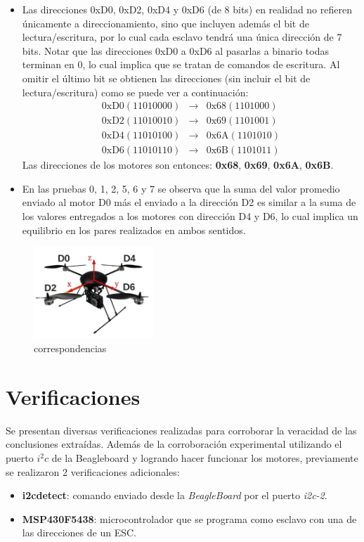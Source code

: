 \documentclass[main]{subfiles}
\begin{document}
\begin{itemize}
\item Las direcciones 0xD0, 0xD2, 0xD4 y 0xD6 (de 8 bits) en realidad no refieren \'unicamente a direccionamiento, sino que incluyen adem\'as el bit de lectura/escritura, por lo cual cada esclavo tendr\'a una \'unica direcci\'on de 7 bits. Notar que las direcciones 0xD0 a 0xD6 al pasarlas a binario todas terminan en 0, lo cual implica que se tratan de comandos de escritura. Al omitir el \'ultimo bit se obtienen las direcciones (sin incluir el bit de lectura/escritura) como se puede ver a continuaci\'on:
\begin{eqnarray}
\mathrm{0xD0} (11010000) &\longrightarrow &\mathrm{0x68} (1101000) \\
\mathrm{0xD2} (11010010) &\longrightarrow &\mathrm{0x69} (1101001) \\
\mathrm{0xD4} (11010100) &\longrightarrow &\mathrm{0x6A} (1101010) \\
\mathrm{0xD6} (11010110) &\longrightarrow &\mathrm{0x6B} (1101011) 
\end{eqnarray}
Las direcciones de los motores son entonces: \textbf{0x68}, \textbf{0x69}, \textbf{0x6A}, \textbf{0x6B}.
\item En las pruebas 0, 1, 2, 5, 6 y 7 se observa que la suma del valor promedio enviado al motor D0 m\'as el enviado a la direcci\'on D2 es similar a la suma de los valores entregados a los motores con direcci\'on D4 y D6, lo cual implica un equilibrio en los pares realizados en ambos sentidos. 
\end{itemize}

\begin{figure}[h!]
	\centering
	\includegraphics[width=0.4\textwidth]{./pics_sniffer/correspondencias.jpg}
	\caption{correspondencias}
	\label{fig:correspondencias}
\end{figure}

\section{Verificaciones}
Se presentan diversas verificaciones realizadas para corroborar la veracidad de las conclusiones extraídas. Adem\'as de la corroboraci\'on experimental utilizando el puerto $i^2c$ de la Beagleboard y logrando hacer funcionar los motores, previamente se realizaron 2 verificaciones adicionales:
\begin{itemize}
	\item \textbf{i2cdetect}: comando enviado desde la \emph{BeagleBoard} por el puerto \emph{i2c-2}.
	\item \textbf{MSP430F5438}: microcontrolador que se programa como esclavo con una de las direcciones de un ESC.
\end{itemize}
\end{document}
